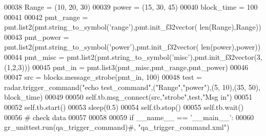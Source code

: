 \begin{DoxyCode}
00038         Range = (10, 20, 30)
00039         power = (15, 30, 45)
00040         block\_time = 100
00041 
00042         pmt\_range = pmt.list2(pmt.string\_to\_symbol(\textcolor{stringliteral}{'range'}),pmt.init\_f32vector(
      len(Range),Range))
00043         pmt\_power = pmt.list2(pmt.string\_to\_symbol(\textcolor{stringliteral}{'power'}),pmt.init\_f32vector(
      len(power),power))
00044         pmt\_misc = pmt.list2(pmt.string\_to\_symbol(\textcolor{stringliteral}{'misc'}),pmt.init\_f32vector(3,(1,2,3)))
00045         pmt\_in = pmt.list3(pmt\_misc,pmt\_range,pmt\_power)
00046 
00047         src = blocks.message\_strobe(pmt\_in, 100)
00048         test = radar.trigger\_command(\textcolor{stringliteral}{"echo test\_command"},(\textcolor{stringliteral}{"Range"},\textcolor{stringliteral}{"power"}),(5, 10),(35, 50), block\_time)
00049         
00050         self.tb.msg\_connect(src,\textcolor{stringliteral}{"strobe"},test,\textcolor{stringliteral}{"Msg in"})
00051         
00052         self.tb.start()
00053         sleep(0.5)
00054         self.tb.stop()
00055         self.tb.wait()
00056         \textcolor{comment}{# check data}
00057 
00058 
00059 \textcolor{keywordflow}{if} \_\_name\_\_ == \textcolor{stringliteral}{'\_\_main\_\_'}:
00060     gr\_unittest.run(qa\_trigger\_command)\textcolor{comment}{#, "qa\_trigger\_command.xml")}
\end{DoxyCode}
